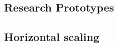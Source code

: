 \subsection{Research Prototypes}
\label{subsec:semweb}


\subsection{Horizontal scaling}
\label{subsec:hscaling}
















